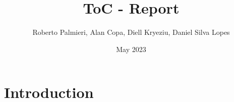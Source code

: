 \documentclass{article}
\title{ToC - Report}
\author{Roberto Palmieri, Alan Copa, Diell Kryeziu, Daniel Silva Lopes}
\date{May 2023}
\begin{document}
\maketitle

\section{Introduction}
\end{document}
